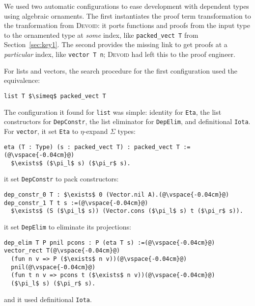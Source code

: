 We used two automatic configurations to ease development with dependent types using algebraic ornaments.
The first instantiates the proof term transformation to the tranformation from \textsc{Devoid}:
it ports functions and proofs from the input type to the ornamented type at \textit{some} index,
like \lstinline{packed_vect T} from Section~\ref{sec:key1}.
The second provides the missing link to get proofs at a \textit{particular} index, like \lstinline{vector T n};
\textsc{Devoid} had left this to the proof engineer.

For lists and vectors, the search procedure for the first configuration used the equivalence:

\begin{lstlisting}
list T $\simeq$ packed_vect T
\end{lstlisting}
The configuration it found for \lstinline{list} was simple: identity for \lstinline{Eta},
the list constructors for \lstinline{DepConstr}, the list eliminator for \lstinline{DepElim},
and definitional \lstinline{Iota}.
For \lstinline{vector}, it set \lstinline{Eta} to $\eta$-expand $\Sigma$ types:

\begin{lstlisting}[backgroundcolor=\color{cyan!30}]
eta (T : Type) (s : packed_vect T) : packed_vect T :=(@\vspace{-0.04cm}@)
  $\exists$ ($\pi_l$ s) ($\pi_r$ s).
\end{lstlisting}
it set \lstinline{DepConstr} to pack constructors: %

\begin{lstlisting}[backgroundcolor=\color{cyan!30}]
dep_constr_0 T : $\exists$ 0 (Vector.nil A).(@\vspace{-0.04cm}@)
dep_constr_1 T t s :=(@\vspace{-0.04cm}@)
  $\exists$ (S ($\pi_l$ s)) (Vector.cons ($\pi_l$ s) t ($\pi_r$ s)).
\end{lstlisting}
it set \lstinline{DepElim} to eliminate its projections:

\begin{lstlisting}[backgroundcolor=\color{cyan!30}]
dep_elim T P pnil pcons : P (eta T s) :=(@\vspace{-0.04cm}@)
vector_rect T(@\vspace{-0.04cm}@)
  (fun n v => P ($\exists$ n v))(@\vspace{-0.04cm}@)
  pnil(@\vspace{-0.04cm}@)
  (fun t n v => pcons t ($\exists$ n v))(@\vspace{-0.04cm}@)
  ($\pi_l$ s) ($\pi_r$ s).
\end{lstlisting}
and it used definitional \lstinline{Iota}.

